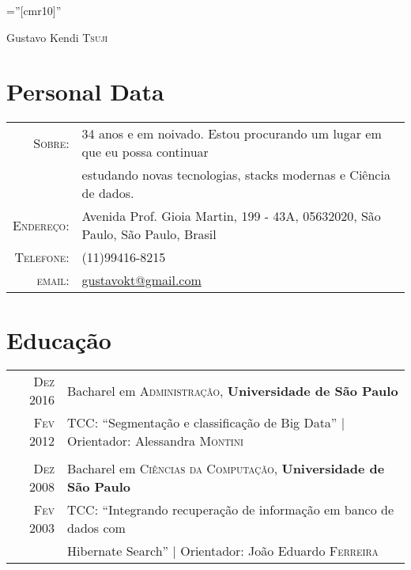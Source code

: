\documentclass[a4paper,10pt]{article}
\begin{document}

\pagestyle{empty} %

\font\fb=''[cmr10]'' %

\par{\centering
    {\Huge Gustavo Kendi \textsc{Tsuji}
  }\bigskip\par}

\section{Personal Data}

\begin{tabular}{rl}
  \textsc{Sobre:}   & 34 anos e em noivado. Estou procurando um lugar em que eu possa continuar \\
    &estudando novas tecnologias, stacks modernas e Ciência de dados.\\
    \textsc{Endereço:}   & Avenida Prof. Gioia Martin, 199 - 43A, 05632020, São Paulo, São Paulo, Brasil \\
    \textsc{Telefone:}     & (11)99416-8215\\
    \textsc{email:}     & \href{mailto:gustavokt@gmail.com}{gustavokt@gmail.com}
\end{tabular}

\section{Educação}
\begin{tabular}{rl} 
 \textsc{Dez} 2016 & Bacharel em \textsc{Administração}, \textbf{Universidade de São Paulo}\\
\textsc{Fev} 2012&TCC: ``Segmentação e classificação de Big Data'' | \small Orientador: Alessandra \textsc{Montini}\\\\
\textsc{Dez} 2008& Bacharel em \textsc{Ciências da Computação}, \textbf{Universidade de São Paulo}\\
\textsc{Fev} 2003& TCC: ``Integrando recuperação de informação em banco de dados com \\
& Hibernate Search'' | \small Orientador: João Eduardo \textsc{Ferreira}\\
\end{tabular}
\end{document}
